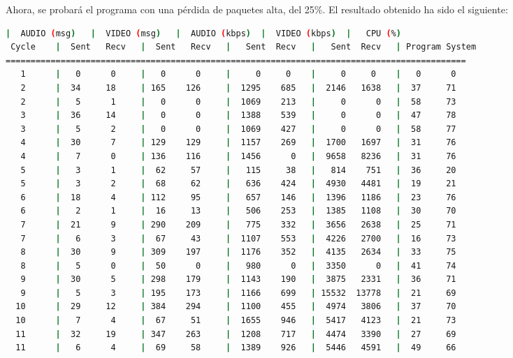\newpage

Ahora, se probará el programa con una pérdida de paquetes alta, del 25\%. El resultado obtenido ha sido el siguiente:
\vspace{\baselineskip}

\begin{adjustbox}{max width=\textwidth}
\begin{lstlisting}[language=bash,basicstyle=\ttfamily\scriptsize]
          |  AUDIO (msg)   |  VIDEO (msg)   |  AUDIO (kbps)  |  VIDEO (kbps)  |   CPU (%)
 Cycle    |  Sent   Recv   |  Sent   Recv   |   Sent  Recv   |   Sent  Recv   | Program System
============================================================================================
   1      |   0      0     |   0      0     |     0     0    |     0     0    |   0      0
   2      |  34     18     | 165    126     |  1295    685   |  2146   1638   |  37     71
   2      |   5      1     |   0      0     |  1069    213   |     0      0   |  58     73
   3      |  36     14     |   0      0     |  1388    539   |     0      0   |  47     78
   3      |   5      2     |   0      0     |  1069    427   |     0      0   |  58     77
   4      |  30      7     | 129    129     |  1157    269   |  1700   1697   |  31     76
   4      |   7      0     | 136    116     |  1456      0   |  9658   8236   |  31     76
   5      |   3      1     |  62     57     |   115     38   |   814    751   |  36     20
   5      |   3      2     |  68     62     |   636    424   |  4930   4481   |  19     21
   6      |  18      4     | 112     95     |   657    146   |  1396   1186   |  23     76
   6      |   2      1     |  16     13     |   506    253   |  1385   1108   |  30     70
   7      |  21      9     | 290    209     |   775    332   |  3656   2638   |  25     71
   7      |   6      3     |  67     43     |  1107    553   |  4226   2700   |  16     73
   8      |  30      9     | 309    197     |  1176    352   |  4135   2634   |  33     75
   8      |   5      0     |  50      0     |   980      0   |  3350      0   |  41     74
   9      |  30      5     | 298    179     |  1143    190   |  3875   2331   |  36     71
   9      |   5      3     | 195    173     |  1166    699   | 15532  13778   |  21     69
  10      |  29     12     | 384    294     |  1100    455   |  4974   3806   |  37     70
  10      |   7      4     |  67     51     |  1655    946   |  5417   4123   |  21     73
  11      |  32     19     | 347    263     |  1208    717   |  4474   3390   |  27     69
  11      |   6      4     |  69     58     |  1389    926   |  5446   4591   |  49     66

\end{lstlisting}
\end{adjustbox}
